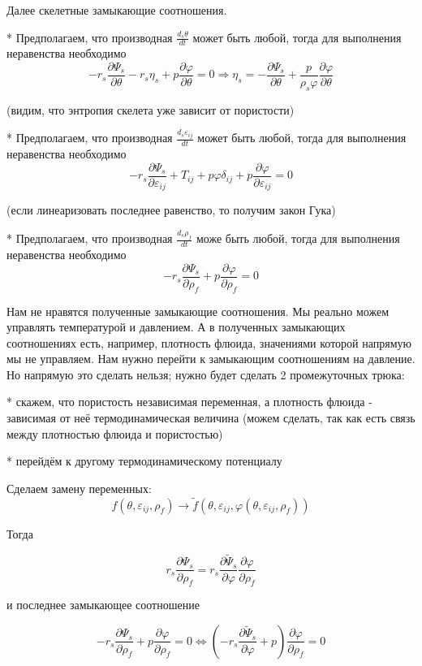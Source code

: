 \documentclass[main.tex]{subfiles}
\begin{document}
Далее скелетные замыкающие соотношения.

* Предполагаем, что производная $\displaystyle{}\frac{d_s\theta}{dt}$ может быть любой, тогда для выполнения неравенства необходимо $$-r_s\frac{\partial\Psi_s}{\partial\theta}-r_s\eta_s+p\frac{\partial\varphi}{\partial\theta}=0\Rightarrow\eta_s=-\frac{\partial\Psi_s}{\partial\theta}+\frac{p}{\rho_s\varphi}\frac{\partial\varphi}{\partial\theta}$$

(видим, что энтропия скелета уже зависит от пористости)

* Предполагаем, что производная $\displaystyle{}\frac{d_s\varepsilon_{ij}}{dt}$ может быть любой, тогда для выполнения неравенства необходимо $$-r_s\frac{\partial\Psi_s}{\partial\varepsilon_{ij}}+T_{ij}+p\varphi\delta_{ij}+p\frac{\partial\varphi}{\partial\varepsilon_{ij}}=0$$

(если линеаризовать последнее равенство, то получим закон Гука)

* Предполагаем, что производная $\displaystyle{}\frac{d_s\rho_f}{dt}$ може быть любой, тогда для выполнения неравенства необходимо $$-r_s\frac{\partial\Psi_s}{\partial\rho_f}+p\frac{\partial\varphi}{\partial\rho_f}=0$$

Нам не нравятся полученные замыкающие соотношения. Мы реально можем управлять температурой и давлением. А в полученных замыкающих соотношениях есть, например, плотность флюида, значениями которой напрямую мы не управляем. Нам нужно перейти к замыкающим соотношениям на давление. Но напрямую это сделать нельзя; нужно будет сделать 2 промежуточных трюка:

* скажем, что пористость независимая переменная, а плотность флюида - зависимая от неё термодинамическая величина (можем сделать, так как есть связь между плотностью флюида и пористостью)

* перейдём к другому термодинамическому потенциалу

Сделаем замену переменных: $$f\left(\theta,\varepsilon_{ij},\rho_f\right)\rightarrow \tilde{f}\left(\theta,\varepsilon_{ij},\varphi(\theta,\varepsilon_{ij},\rho_f)\right)$$

Тогда

$$r_s\frac{\partial\Psi_s}{\partial\rho_f}=r_s\frac{\partial\tilde{\Psi}_s}{\partial\varphi}\frac{\partial\varphi}{\partial\rho_f}$$

и последнее замыкающее соотношение

$$-r_s\frac{\partial\Psi_s}{\partial\rho_f}+p\frac{\partial\varphi}{\partial\rho_f}=0\Leftrightarrow \left(-r_s\frac{\partial\tilde{\Psi}_s}{\partial\varphi}+p\right)\frac{\partial\varphi}{\partial\rho_f}=0$$
\end{document}
